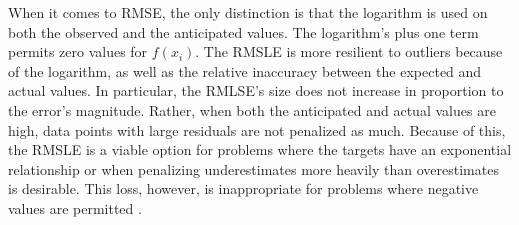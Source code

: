 \documentclass{article}
\begin{document}
\begin{enumerate}
     When it comes to RMSE, the only distinction is that the logarithm is used on both the observed and the anticipated values. The logarithm's plus one term permits zero values for $f(x_i)$. The RMSLE is more resilient to outliers because of the logarithm, as well as the relative inaccuracy between the expected and actual values. In particular, the RMLSE's size does not increase in proportion to the error's magnitude. Rather, when both the anticipated and actual values are high, data points with large residuals are not penalized as much. Because of this, the RMSLE is a viable option for problems where the targets have an exponential relationship or when penalizing underestimates more heavily than overestimates is desirable. This loss, however, is inappropriate for problems where negative values are permitted \citep{ciampiconi2023survey}.
  \end{enumerate}
\end{document}
